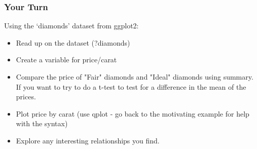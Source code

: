 \documentclass{beamer}\usepackage[]{graphicx}\usepackage[]{color}
\begin{document}
\begin{frame}[fragile]
    \frametitle{Your Turn}
    Using the `diamonds' dataset from ggplot2:
    \begin{itemize}
        \item Read up on the dataset (?diamonds)
        \item Create a variable for price/carat
        \item Compare the price of "Fair" diamonds and "Ideal" diamonds using summary.  If you want to try to do a t-test to test for a difference in the mean of the prices.
        \item Plot price by carat (use qplot - go back to the motivating example for help with the syntax)
        \item Explore any interesting relationships you find.
    \end{itemize}
\end{frame}
\end{document}
